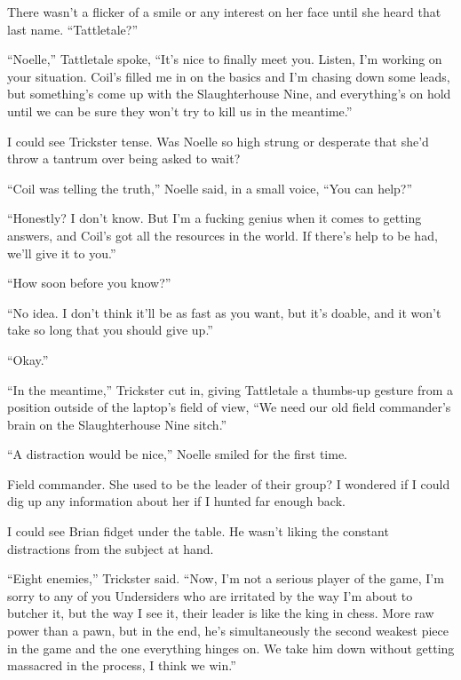 There wasn't a flicker of a smile or any interest on her face until she heard that last name.  ``Tattletale?''



``Noelle,'' Tattletale spoke, ``It's nice to finally meet you.  Listen, I'm working on your situation.  Coil's filled me in on the basics and I'm chasing down some leads, but something's come up with the Slaughterhouse Nine, and everything's on hold until we can be sure they won't try to kill us in the meantime.''



I could see Trickster tense.  Was Noelle so high strung or desperate that she'd throw a tantrum over being asked to wait?



``Coil was telling the truth,'' Noelle said, in a small voice, ``You can help?''



``Honestly?  I don't know.  But I'm a fucking genius when it comes to getting answers, and Coil's got all the resources in the world.  If there's help to be had, we'll give it to you.''



``How soon before you know?''



``No idea.  I don't think it'll be as fast as you want, but it's doable, and it won't take so long that you should give up.''



``Okay.''



``In the meantime,'' Trickster cut in, giving Tattletale a thumbs-up gesture from a position outside of the laptop's  field of view, ``We need our old field commander's brain on the Slaughterhouse Nine sitch.''



``A distraction would be nice,'' Noelle smiled for the first time.



Field commander.  She used to be the leader of their group?  I wondered if I could dig up any information about her if I hunted far enough back.



I could see Brian fidget under the table.  He wasn't liking the constant distractions from the subject at hand.



``Eight enemies,'' Trickster said.  ``Now, I'm not a serious player of the game, I'm sorry to any of you Undersiders who are irritated by the way I'm about to butcher it, but the way I see it, their leader is like the king in chess.  More raw power than a pawn, but in the end, he's simultaneously the second weakest piece in the game and the one everything hinges on.  We take him down without getting massacred in the process, I think we win.''



